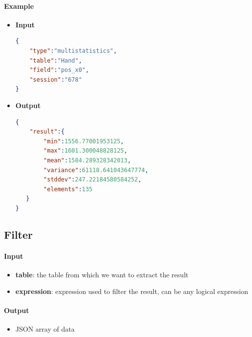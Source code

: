 \documentclass[a4paper,notitlepage,onecolumn]{hitec}  %
\begin{document}
\paragraph{Example}
\begin{itemize}
\item\textbf{Input}
\begin{lstlisting}[language=json,firstnumber=1]
{  
	"type":"multistatistics",
	"table":"Hand",
	"field":"pos_x0",
	"session":"678"
}
\end{lstlisting}
\item\textbf{Output}
\begin{lstlisting}[language=json,firstnumber=1]
{  
	"result":{  
		"min":1556.77001953125,
		"max":1601.300048828125,
		"mean":1584.289328342013,
		"variance":61118.641043647774,
		"stddev":247.22184580584252,
		"elements":135
   }
}
\end{lstlisting}
\end{itemize}

\subsection{Filter}

\paragraph{Input}
\begin{itemize}
\item\textbf{table}: the table from which we want to extract the result
\item\textbf{expression}: expression used to filter the result, can be any logical expression
\end{itemize}

\paragraph{Output}
\begin{itemize}
\item JSON array of data
\end{itemize}
\end{document}
